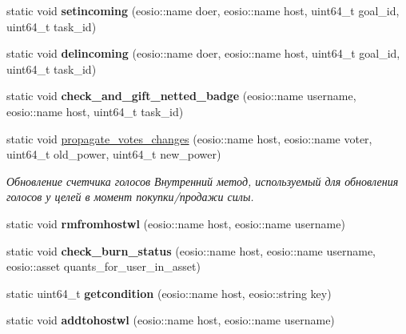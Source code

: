 \begin{DoxyCompactItemize}
\mbox{\label{classunicore_a85158234a313fe5b2dc08b3cd9210dd6}} 
static void {\bfseries setincoming} (eosio\+::name doer, eosio\+::name host, uint64\+\_\+t goal\+\_\+id, uint64\+\_\+t task\+\_\+id)
\item 
\mbox{\label{classunicore_a61a8cdde982effe739244f9b4015a5f5}} 
static void {\bfseries delincoming} (eosio\+::name doer, eosio\+::name host, uint64\+\_\+t goal\+\_\+id, uint64\+\_\+t task\+\_\+id)
\item 
\mbox{\label{classunicore_aafefe860d9af675b4bb1a4ec1477cffd}} 
static void {\bfseries check\+\_\+and\+\_\+gift\+\_\+netted\+\_\+badge} (eosio\+::name username, eosio\+::name host, uint64\+\_\+t task\+\_\+id)
\item 
static void \mbox{\hyperlink{classunicore_a9db4a730ab5cb5c91f4af22fcbe314fc}{propagate\+\_\+votes\+\_\+changes}} (eosio\+::name host, eosio\+::name voter, uint64\+\_\+t old\+\_\+power, uint64\+\_\+t new\+\_\+power)
\begin{DoxyCompactList}\small\item\em Обновление счетчика голосов Внутренний метод, используемый для обновления голосов у целей в момент покупки/продажи силы. \end{DoxyCompactList}\item 
\mbox{\label{classunicore_abcc8b6f0d5fabea652fb09b641ae1b87}} 
static void {\bfseries rmfromhostwl} (eosio\+::name host, eosio\+::name username)
\item 
\mbox{\label{classunicore_a025c27857c9bfe21219241279e0dd61e}} 
static void {\bfseries check\+\_\+burn\+\_\+status} (eosio\+::name host, eosio\+::name username, eosio\+::asset quants\+\_\+for\+\_\+user\+\_\+in\+\_\+asset)
\item 
\mbox{\label{classunicore_a136dfcacb74672c4f8babbe80275ab80}} 
static uint64\+\_\+t {\bfseries getcondition} (eosio\+::name host, eosio\+::string key)
\item 
\mbox{\label{classunicore_a6944e1980de8d07225c5dd4ee1157634}} 
static void {\bfseries addtohostwl} (eosio\+::name host, eosio\+::name username)
\item 
\mbox{\label{classunicore_a4b3c7544b822d31c8b826001ac1adaa2}} 

\end{DoxyCompactItemize}
